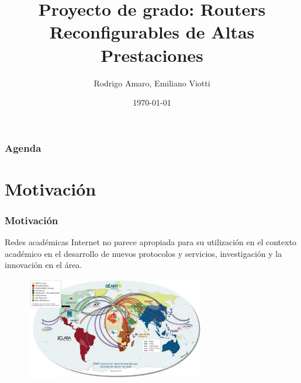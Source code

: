 \documentclass{beamer}
\title[RRAP]{Proyecto de grado: Routers Reconfigurables de Altas Prestaciones} %
\author{Rodrigo Amaro, Emiliano Viotti}
\institute[UdelaR] %
{
Instituto de Computaci\'on \\ Facultad de Ingeniería \\ Universidad de la República \\ \vspace{0.2cm} Tutores: Dr. Eduardo Gramp\'in, MSc. Mart\'in Giachino %
}
\date{\today} %
\begin{document}
\begin{frame}
\titlepage %
\end{frame}


\begin{frame}
\frametitle{Agenda} %
\tableofcontents %
\end{frame}




\section{Motivaci\'on} 
\frame{\tableofcontents[currentsection]}

\begin{frame}
\frametitle{Motivaci\'on} 

\begin{block}{Redes acad\'emicas}
Internet no parece apropiada para su utilizaci\'on en el contexto académico en el desarrollo de nuevos protocolos y servicios, investigaci\'on y la innovaci\'on en el \'area.
\end{block}

\begin{figure}[h] 
\centering    
\includegraphics[width=0.7\textwidth]{imagenes/redesAcademicas.png}
\label{fig:AcademicNetworks}
\end{figure}

\end{frame}
\end{document}
